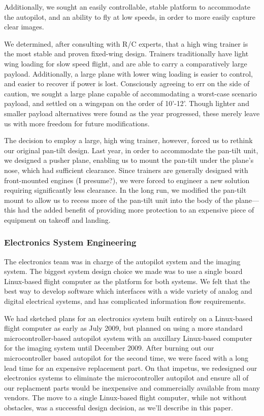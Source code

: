 \documentclass[10pt,twocolumns]{report}
\begin{document}
Additionally, we sought an easily controllable, stable platform to accommodate the autopilot, and an ability to fly at low speeds, in order to more easily capture clear images.

We determined, after consulting with R/C experts, that a high wing trainer is the most stable and proven fixed-wing design. Trainers traditionally have light wing loading for slow speed flight, and are able to carry a comparatively large payload. Additionally, a large plane with lower wing loading is easier to control, and easier to recover if power is lost. Consciously agreeing to err on the side of caution, we sought a large plane capable of accommodating a worst-case scenario payload, and settled on a wingspan on the order of 10'-12'. Though lighter and smaller payload alternatives were found as the year progressed, these merely leave us with more freedom for future modifications.

The decision to employ a large, high wing trainer, however, forced us to rethink our original pan-tilt design. Last year, in order to accommodate the pan-tilt unit, we designed a pusher plane, enabling us to mount the pan-tilt under the plane's nose, which had sufficient clearance. Since trainers are generally designed with front-mounted engines (I presume?), we were forced to engineer a new solution requiring significantly less clearance. In the long run, we modified the pan-tilt mount to allow us to recess more of the pan-tilt unit into the body of the plane---this had the added benefit of providing more protection to an expensive piece of equipment on takeoff and landing.

\subsubsection{Electronics System Engineering}

The electronics team was in charge of the autopilot system and the imaging system. The biggest system design choice we made was to use a single board Linux-based flight computer as the platform for both systems. We felt that the best way to develop software which interfaces with a wide variety of analog and digital electrical systems, and has complicated information flow requirements.

We had sketched plans for an electronics system built entirely on a Linux-based flight computer as early as July 2009, but planned on using a more standard microcontroller-based autopilot system with an auxillary Linux-based computer for the imaging system until December 2009. After burning out our microcontroller based autopilot for the second time, we were faced with a long lead time for an expensive replacement part. On that impetus, we redesigned our electronics systems to eliminate the microcontroller autopilot and ensure all of our replacment parts would be inexpensive and commercially available from many vendors. The move to a single Linux-based flight computer, while not without obstacles, was a successful design decision, as we'll describe in this paper.
\end{document}
